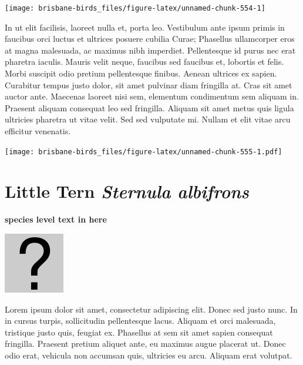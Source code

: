\documentclass[]{book}
\let\origfigure\figure
\let\endorigfigure\endfigure
\renewenvironment{figure}[1][2] {
  \expandafter\origfigure\expandafter[H]
} {
  \endorigfigure
}
\begin{document}
\begin{figure}
\texttt{[image: brisbane-birds\_files/figure-latex/unnamed-chunk-554-1]} \caption{insert figure caption}\label{fig:unnamed-chunk-554}
\end{figure}

In ut elit facilisis, laoreet nulla et, porta leo. Vestibulum ante ipsum
primis in faucibus orci luctus et ultrices posuere cubilia Curae;
Phasellus ullamcorper eros at magna malesuada, ac maximus nibh
imperdiet. Pellentesque id purus nec erat pharetra iaculis. Mauris velit
neque, faucibus sed faucibus et, lobortis et felis. Morbi suscipit odio
pretium pellentesque finibus. Aenean ultrices ex sapien. Curabitur
tempus justo dolor, sit amet pulvinar diam fringilla at. Cras sit amet
auctor ante. Maecenas laoreet nisi sem, elementum condimentum sem
aliquam in. Praesent aliquam consequat leo sed fringilla. Aliquam sit
amet metus quis ligula ultricies pharetra ut vitae velit. Sed sed
vulputate mi. Nullam et elit vitae arcu efficitur venenatis.

\begin{figure}
\centering
\texttt{[image: brisbane-birds\_files/figure-latex/unnamed-chunk-555-1.pdf]}
\caption{\label{fig:unnamed-chunk-555}insert figure caption}
\end{figure}

\section{\texorpdfstring{Little Tern \emph{Sternula
albifrons}}{Little Tern Sternula albifrons}}\label{little-tern-sternula-albifrons}

\textbf{species level text in here}

\begin{figure}
\centering
\includegraphics{assets/missing.png}
\caption{No image for species}
\end{figure}

Lorem ipsum dolor sit amet, consectetur adipiscing elit. Donec sed justo
nunc. In in cursus turpis, sollicitudin pellentesque lacus. Aliquam et
orci malesuada, tristique justo quis, feugiat ex. Phasellus at sem sit
amet sapien consequat fringilla. Praesent pretium aliquet ante, eu
maximus augue placerat ut. Donec odio erat, vehicula non accumsan quis,
ultricies eu arcu. Aliquam erat volutpat.
\end{document}
